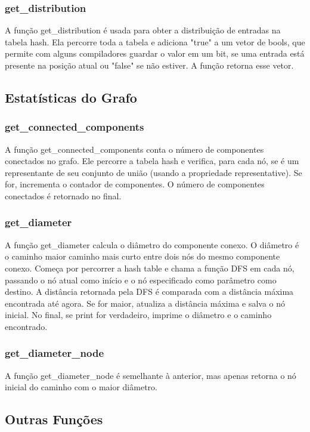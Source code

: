 \documentclass[a4paper,11pt]{article}
\begin{document}
    \subsubsection{get\_distribution}
    A função get\_distribution é usada para obter a distribuição de entradas na tabela hash. Ela percorre toda a tabela e adiciona "true" a um vetor de bools, que permite com alguns compiladores guardar o valor em um bit, se uma entrada está presente na posição atual ou "false" se não estiver. A função retorna esse vetor.
    
    \subsection{Estatísticas do Grafo}\label{subsec:estatisticas-do-grafo}
    
    \subsubsection{get\_connected\_components}
    A função get\_connected\_components conta o número de componentes conectados no grafo. Ele percorre a tabela hash e verifica, para cada nó, se é um representante de seu conjunto de união (usando a propriedade representative). Se for, incrementa o contador de componentes. O número de componentes conectados é retornado no final.
    
    \subsubsection{get\_diameter}
    A função get\_diameter calcula o diâmetro do componente conexo. O diâmetro é o caminho maior caminho mais curto entre dois nós do mesmo componente conexo. Começa por percorrer a hash table e chama a função DFS em cada nó, passando o nó atual como início e o nó especificado como parâmetro como destino. A distância retornada pela DFS é comparada com a distância máxima encontrada até agora. Se for maior, atualiza a distância máxima e salva o nó inicial. No final, se print for verdadeiro, imprime o diâmetro e o caminho encontrado.
    
    \subsubsection{get\_diameter\_node}
    A função get\_diameter\_node é semelhante à anterior, mas apenas retorna o nó inicial do caminho com o maior diâmetro.
    

    \subsection{Outras Funções}\label{subsec:outras-funcoes}
\end{document}
